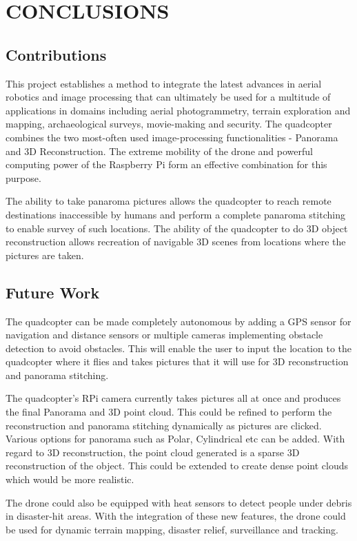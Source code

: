 
\chapter{CONCLUSIONS} %
\section{Contributions}
This project establishes a method to integrate the latest advances in aerial robotics and image processing that can ultimately be used for a multitude of applications in domains including aerial photogrammetry, terrain exploration and mapping, archaeological surveys, movie-making and security. The quadcopter combines the two most-often used image-processing functionalities - Panorama and 3D Reconstruction. The extreme mobility of the drone and powerful computing power of the Raspberry Pi form an effective combination for this purpose.
\par
The ability to take panaroma pictures allows the quadcopter to reach remote destinations inaccessible by humans and perform a complete panaroma stitching to enable survey of such locations.
The ability of the quadcopter to do 3D object reconstruction allows recreation of navigable 3D scenes from locations where the pictures are taken.
\section{Future Work}
The quadcopter can be made completely autonomous by adding a GPS sensor for navigation and distance sensors or multiple cameras implementing obstacle detection to avoid obstacles. This will enable the user to input the location to the quadcopter where it flies and takes pictures that it will use for 3D reconstruction and panorama stitching.
\par
The quadcopter's RPi camera currently takes pictures all at once and produces the final Panorama and 3D point cloud. This could be refined to perform the reconstruction and panorama stitching dynamically as pictures are clicked. Various options for panorama such as Polar, Cylindrical etc can be added. With regard to 3D reconstruction, the point cloud generated is a sparse 3D reconstruction of the object. This could be extended to create dense point clouds which would be more realistic. 
\par
The drone could also be equipped with heat sensors to detect people under debris in disaster-hit areas.
With the integration of these new features, the drone could be used for dynamic terrain mapping, disaster relief, surveillance and tracking.